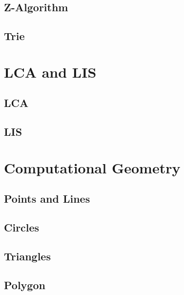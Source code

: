 \subsection{Z-Algorithm}
\raggedbottom
\hrulefill
\subsection{Trie}
\raggedbottom
\hrulefill

\section{LCA and LIS}
\subsection{LCA}
\raggedbottom
\hrulefill
\subsection{LIS}
\raggedbottom
\hrulefill

\section{Computational Geometry}
\subsection{Points and Lines}
\raggedbottom
\hrulefill
\subsection{Circles}
\raggedbottom
\hrulefill
\subsection{Triangles}
\raggedbottom
\hrulefill
\subsection{Polygon}
\raggedbottom
\hrulefill

